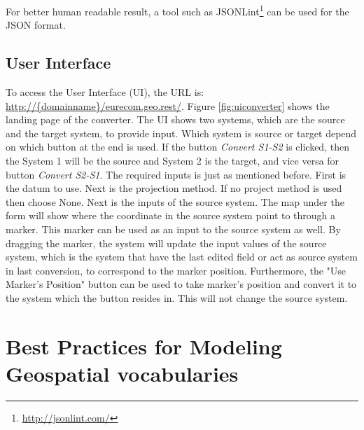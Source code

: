 For better human readable result, a tool such as JSONLint\footnote{ \url{http://jsonlint.com/}} can be used for the JSON format.


\subsection{User Interface}
To access the User Interface (UI), the URL is: \url{http://{domainname}/eurecom.geo.rest/}. Figure \ref{fig:uiconverter} shows the landing page of the converter. The UI shows two systems, which are the source and the target system, to provide input. Which system is source or target depend on which button at the end is used. If the button \textit{Convert S1-S2} is clicked, then the System 1 will be the source and System 2 is the target, and vice versa for button \textit{Convert S2-S1}.
The required inputs is just as mentioned before. First is the datum to use. Next is the projection method. If no project method is used then choose None. Next is the inputs of the source system.
The map under the form will show where the coordinate in the source system point to through a marker. This marker can be used as an input to the source system as well.
By dragging the marker, the system will update the input values of the source system, which is the system that have the last edited field or act as source system in last conversion, to correspond to the marker position. Furthermore, the "Use Marker's Position" button can be used to take marker's position and convert it to the system which the button resides in. This will not change the source system.


\begin{figure}[!htp]
\end{figure}


\section{Best Practices for Modeling Geospatial vocabularies}
\label{sec:bpgeo}

